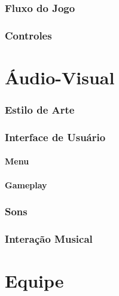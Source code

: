 \documentclass[11pt]{article}
\begin{document}
\section{Fluxo do Jogo}
 
\section{Controles}
\newpage 
\part{Áudio-Visual}
\section{Estilo de Arte}
 
\section{Interface de Usuário}
\subsection{Menu}
 
\subsection{Gameplay}
 
\section{Sons}
 
\section{Interação Musical}
\newpage
\part{Equipe}
\end{document}

